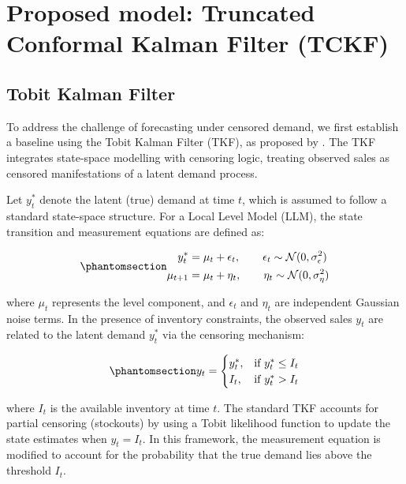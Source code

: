\documentclass[
  11pt,
  authoryear,
  doubleblind,
  3p]{elsarticle}
\begin{document}
\endgroup{}

\section{Proposed model: Truncated Conformal Kalman Filter
(TCKF)}\label{sec-model_wp2}

\subsection{Tobit Kalman Filter}\label{tobit-kalman-filter}

To address the challenge of forecasting under censored demand, we first
establish a baseline using the Tobit Kalman Filter (TKF), as proposed by
\citet{trapero2024}. The TKF integrates state-space modelling with
censoring logic, treating observed sales as censored manifestations of a
latent demand process.

Let \(y_t^{*}\) denote the latent (true) demand at time \(t\), which is
assumed to follow a standard state-space structure. For a Local Level
Model (LLM), the state transition and measurement equations are defined
as:

\begin{equation}\phantomsection\label{eq-tkf-main}{
\begin{aligned}
y_t^{*} &= \mu_t + \epsilon_t, \qquad \epsilon_t \sim \mathcal{N}(0, \sigma_{\epsilon}^{2}) \\
\mu_{t+1} &= \mu_t + \eta_t, \qquad \eta_t \sim \mathcal{N}(0, \sigma_{\eta}^{2})
\end{aligned}
}\end{equation}

where \(\mu_t\) represents the level component, and \(\epsilon_t\) and
\(\eta_t\) are independent Gaussian noise terms. In the presence of
inventory constraints, the observed sales \(y_t\) are related to the
latent demand \(y_t^{*}\) via the censoring mechanism:

\begin{equation}\phantomsection\label{eq-tkf-2}{
y_t =
\begin{cases}
y_t^{*}, & \text{if } y_t^{*} \le I_t \\
I_t, & \text{if } y_t^{*} > I_t
\end{cases}
}\end{equation}

where \(I_t\) is the available inventory at time \(t\). The standard TKF
accounts for partial censoring (stockouts) by using a Tobit likelihood
function to update the state estimates when \(y_t = I_t\). In this
framework, the measurement equation is modified to account for the
probability that the true demand lies above the threshold \(I_t\).
\end{document}
